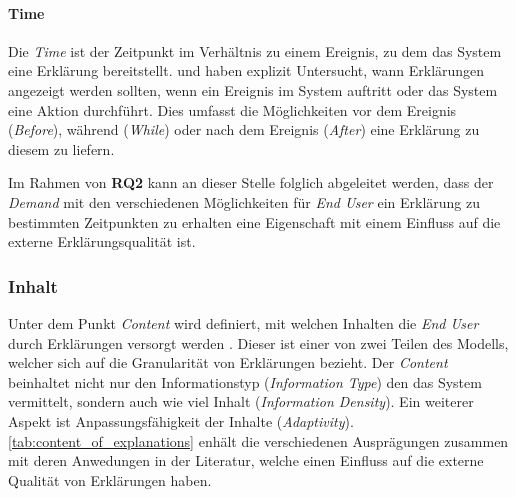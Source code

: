 \paragraph{Time} Die \textit{Time} ist der Zeitpunkt im Verhältnis zu einem Ereignis, zu dem das System eine Erklärung bereitstellt. \citeauthor{rosenfeld_explainability_2019} und \citeauthor{wiegand_id_2020} haben explizit Untersucht, wann Erklärungen angezeigt werden sollten, wenn ein Ereignis im System auftritt oder das System eine Aktion durchführt. Dies umfasst die Möglichkeiten vor dem Ereignis (\textit{Before}), während (\textit{While}) oder nach dem Ereignis (\textit{After}) eine Erklärung zu diesem zu liefern.

\smallskip

Im Rahmen von \textbf{RQ2} kann an dieser Stelle folglich abgeleitet werden, dass der \textit{Demand} mit den verschiedenen Möglichkeiten für \textit{End User} ein Erklärung zu bestimmten Zeitpunkten zu erhalten eine Eigenschaft mit einem Einfluss auf die externe Erklärungsqualität ist.

\subsubsection{Inhalt}

Unter dem Punkt \textit{Content} wird definiert, mit welchen Inhalten die \textit{End User} durch Erklärungen versorgt werden \cite{nunes_systematic_2017}. Dieser ist einer von zwei Teilen des Modells, welcher sich auf die Granularität von Erklärungen bezieht. Der \textit{Content} beinhaltet nicht nur den Informationstyp (\textit{Information Type}) den das System vermittelt, sondern auch wie viel Inhalt (\textit{Information Density}). Ein weiterer Aspekt ist Anpassungsfähigkeit der Inhalte (\textit{Adaptivity}). \autoref{tab:content_of_explanations} enhält die verschiedenen Ausprägungen zusammen mit deren Anwedungen in der Literatur, welche einen Einfluss auf die externe Qualität von Erklärungen haben.

